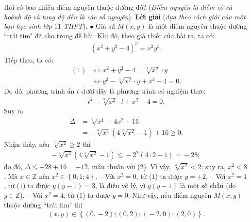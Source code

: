 \begin{multicols}{2}
\begin{figure}[H]
	\end{figure}
	Hỏi có bao nhiêu điểm nguyên thuộc đường đó?  
	\vskip 0.01cm
	({\it Điểm nguyên là điểm có cả hoành độ và tung độ đều là các số nguyên}).
	\vskip 0.01cm
	\textbf{\color{thachthuctoanhoc}Lời giải} (\textit{dựa theo cách giải của một bạn học sinh lớp $11$ THPT})\textbf{\color{thachthuctoanhoc}.}
	\vskip 0.01cm
	$\bullet$ Giả sử $M(x, y)$ là một điểm nguyên thuộc đường ``trái tim" đã cho trong đề bài. Khi đó, theo giả thiết của bài ra, ta có:
	\begin{align*}
		{\left( {{x^2} + {y^2} - 4} \right)^3} = {x^2}{y^3}. \tag{$1$}
	\end{align*}
	Tiếp theo, ta có:
	\begin{align*}
		(1) &\Leftrightarrow {x^2} + {y^2} - 4 = \sqrt[3]{{{x^2}}} \cdot y\\[-0.5ex]
		 &\Leftrightarrow {y^2} - \sqrt[3]{{{x^2}}} \cdot y + {x^2} - 4 = 0.
	\end{align*}
	Do đó, phương trình ẩn $t$ dưới đây là phương trình có nghiệm thực:
	\begin{align*}
		{t^2} - \sqrt[3]{{{x^2}}} \cdot t + {x^2} - 4 = 0.
	\end{align*}
	Suy ra
	\begin{align*}
		\Delta  &= \sqrt[3]{{{x^4}}} - 4{x^2} + 16 \\[-0.5ex]
		&=  - \sqrt[3]{{{x^4}}}\left( {4\sqrt[3]{{{x^2}}} - 1} \right) + 16 \ge 0. \tag{$2$}
	\end{align*}
	Nhận thấy, nếu $\sqrt[3]{{{x^2}}} \ge 2$  thì
	\begin{align*}
		-\! \sqrt[3]{{{x^4}}}\left( {4\sqrt[3]{{{x^2}}} \!-\! 1} \right) \le  \!-\! {2^2}\left( {4 \cdot 2 \!-\! 1} \right) =  \!-\! 28;
	\end{align*}
	do đó, $\Delta \le - 28 + 16 = -12$, mâu thuẫn với ($2$).
	\vskip 0.01cm
	Vì vậy, $\sqrt[3]{{{x^2}}} < 2$; suy ra, $x^2 < 8$. Mà $x \in \mathbb{Z}$ nên ${x^2} \in \left\{ {0;1;4} \right\}$.
	\vskip 0.01cm 
	-- Với $x^2 = 0$,  từ ($1$) ta được $y = \pm 2$.
	\vskip 0.01cm 
	-- Với $x^2 = 1$,  từ ($1$) ta được $y (y-1) = 3$,  là điều vô lý, vì $y(y-1)$  là một số chẵn (do  $y \in \mathbb{Z}$).
	\vskip 0.01cm
	-- Với $x^2 = 4$,  từ ($1$) ta được $y = 0$.
	\vskip 0.01cm
	Như vậy, nếu điểm nguyên $M(x, y)$ thuộc đường ``trái tim" thì
	\begin{align*}
		\left( {x,y} \right) \!\in\! \left\{\! {\left( {0, \!-\! 2} \right)\!;\!\left( {0,2} \right)\!;\!\left( { \!-\! 2,0} \right)\!;\!\left( {2,0} \right)} \!\right\}. \tag{$3$}
	\end{align*}

\end{multicols}
